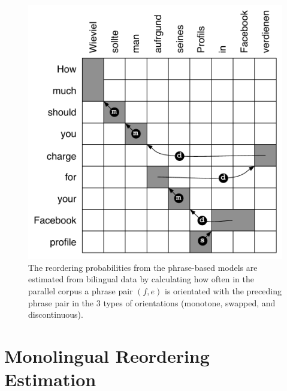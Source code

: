 \documentclass[11pt,letterpaper]{article}
\begin{document}
\begin{figure}[t]
\begin{center}
\includegraphics[width=0.8 \linewidth]{../figures/reorderfeats/reorderfeats.pdf}
\caption{The reordering probabilities from the phrase-based models are estimated from bilingual data by calculating how often in the parallel corpus a phrase pair $(f, e)$ is orientated with the preceding phrase pair in the 3 types of orientations (monotone, swapped, and discontinuous). }
\label{fig:reorderfeats} 
\end{center}
\end{figure}

\section{Monolingual Reordering Estimation} \label{sect:order}
\end{document}

